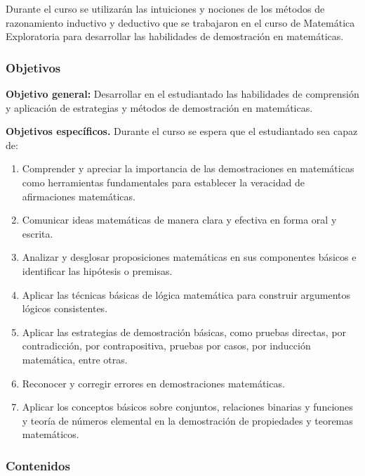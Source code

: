 \begin{refsection}
Durante el curso se utilizarán las intuiciones y nociones de los métodos de razonamiento inductivo y deductivo que se trabajaron en el curso de Matemática Exploratoria para desarrollar las habilidades de demostración en matem\'aticas. 




\subsubsection*{Objetivos}

\textbf{Objetivo general:} Desarrollar en el estudiantado las habilidades de comprensión y aplicación de estrategias y métodos de demostración en matemáticas.

\textbf{Objetivos específicos.} Durante el curso se espera que el estudiantado sea capaz de:

\begin{enumerate} \setlength\itemsep{1pt}
\item Comprender y apreciar la importancia de las demostraciones en matemáticas como herramientas fundamentales para establecer la veracidad de afirmaciones matemáticas.

\item Comunicar ideas matemáticas de manera clara y efectiva en forma oral y escrita.
  
\item Analizar y desglosar proposiciones matemáticas en sus componentes básicos e identificar las hipótesis o premisas.
  
\item Aplicar las técnicas básicas de lógica matemática para construir argumentos lógicos consistentes.
  
\item Aplicar las estrategias de demostración básicas, como pruebas directas, por contradicción, por contrapositiva, pruebas por casos, por inducción matemática, entre otras.
  
\item Reconocer y corregir errores en demostraciones matemáticas.

\item Aplicar los conceptos básicos sobre conjuntos, relaciones binarias y funciones y teoría de números elemental en la demostración de propiedades y teoremas matemáticos.
\end{enumerate}

\newpage
\subsubsection*{Contenidos}



\end{refsection}
